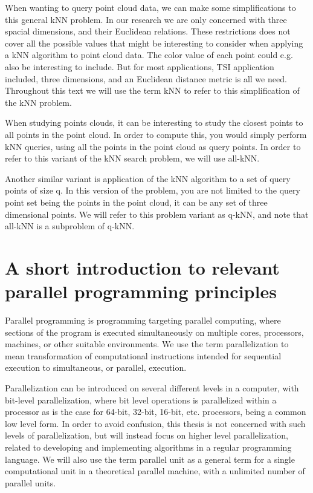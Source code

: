 When wanting to query point cloud data, we can make some simplifications to this general kNN problem. In our research we are only concerned with three spacial dimensions, and their Euclidean relations. These restrictions does not cover all the possible values that might be interesting to consider when applying a kNN algorithm to point cloud data. The color value of each point could e.g. also be interesting to include. But for most applications, TSI application included, three dimensions, and an Euclidean distance metric is all we need. Throughout this text we will use the term kNN to refer to this simplification of the kNN problem.

When studying points clouds, it can be interesting to study the closest points to all points in the point cloud. In order to compute this, you would simply perform kNN queries, using all the points in the point cloud as query points. In order to refer to this variant of the kNN search problem, we will use all-kNN.

Another similar variant is application of the kNN algorithm to a set of query points of size q. In this version of the problem, you are not limited to the query point set being the points in the point cloud, it can be any set of three dimensional points. We will refer to this problem variant as q-kNN, and note that all-kNN is a subproblem of q-kNN.

\section{A short introduction to relevant parallel programming principles} %
\label{sub:a_short_introduction_to_relevant_parallel_programming_principles}

Parallel programming is programming targeting parallel computing, where sections of the program is executed simultaneously on multiple cores, processors, machines, or other suitable environments. We use the term parallelization to mean transformation of computational instructions intended for sequential execution to simultaneous, or parallel, execution.

Parallelization can be introduced on several different levels in a computer, with bit-level parallelization, where bit level operations is parallelized within a processor as is the case for 64-bit, 32-bit, 16-bit, etc. processors, being a common low level form. In order to avoid confusion, this thesis is not concerned with such levels of parallelization, but will instead focus on higher level parallelization, related to developing and implementing algorithms in a regular programming language. We will also use the term parallel unit as a general term for a single computational unit in a theoretical parallel machine, with a unlimited number of parallel units.


